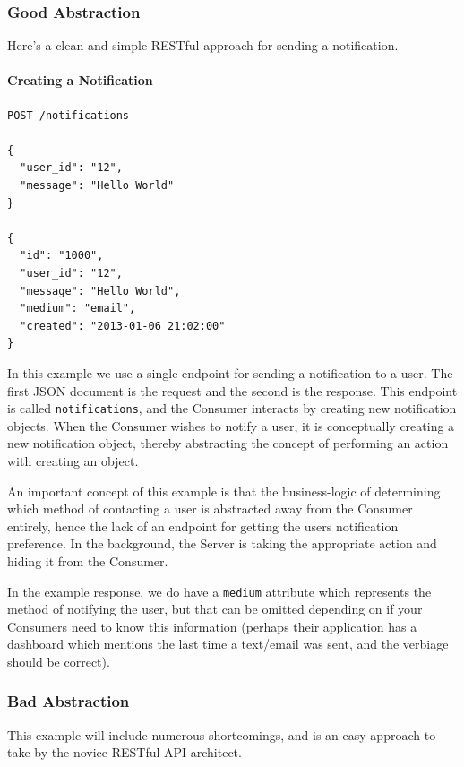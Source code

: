 \documentclass{book}
\begin{document}
\subsubsection{Good Abstraction}

Here's a clean and simple RESTful approach for sending a notification.

\paragraph{\textbf{Creating a Notification}}

\begin{verbatim}
POST /notifications

{
  "user_id": "12",
  "message": "Hello World"
}

{
  "id": "1000",
  "user_id": "12",
  "message": "Hello World",
  "medium": "email",
  "created": "2013-01-06 21:02:00"
}
\end{verbatim}

In this example we use a single endpoint for sending a notification to a user. The first JSON document is the request and the second is the response. This endpoint is called \texttt{notifications}, and the Consumer interacts by creating new notification objects. When the Consumer wishes to notify a user, it is conceptually creating a new notification object, thereby abstracting the concept of performing an action with creating an object.

An important concept of this example is that the business-logic of determining which method of contacting a user is abstracted away from the Consumer entirely, hence the lack of an endpoint for getting the users notification preference. In the background, the Server is taking the appropriate action and hiding it from the Consumer.

In the example response, we do have a \texttt{medium} attribute which represents the method of notifying the user, but that can be omitted depending on if your Consumers need to know this information (perhaps their application has a dashboard which mentions the last time a text/email was sent, and the verbiage should be correct).

\subsubsection{Bad Abstraction}

This example will include numerous shortcomings, and is an easy approach to take by the novice RESTful API architect.
\end{document}

